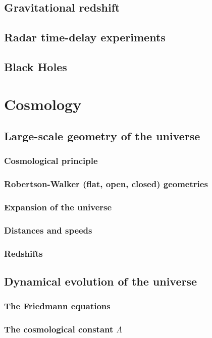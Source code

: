 \documentclass{book}
\theoremstyle{definition}
\begin{document}
\section{Gravitational redshift}
\section{Radar time-delay experiments}
\section{Black Holes}

\newpage

\chapter{Cosmology}
\section{Large-scale geometry of the universe}
\subsection{Cosmological principle}
\subsection{Robertson-Walker (flat, open, closed) geometries}
\subsection{Expansion of the universe}
\subsection{Distances and speeds}
\subsection{Redshifts}
\section{Dynamical evolution of the universe}
\subsection{The Friedmann equations}
\subsection{The cosmological constant $\Lambda$}
\end{document}
